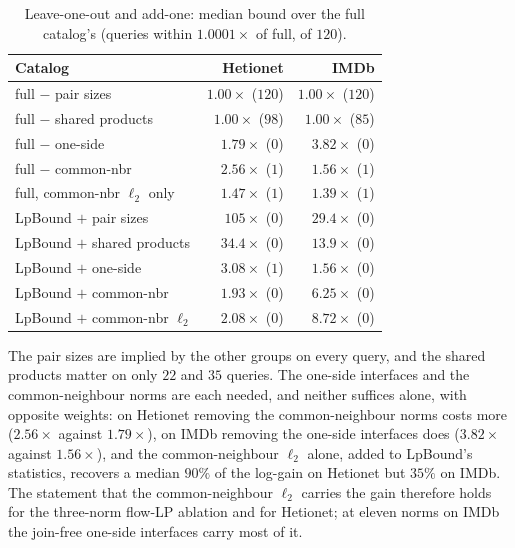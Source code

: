 \documentclass[11pt]{article}
\begin{document}
\begin{table}[h]
\centering
\caption{Leave-one-out and add-one: median bound over the full catalog's
(queries within $1.0001\times$ of full, of $120$).}
\label{tab:loo}
\small
\begin{tabular}{@{}lrr@{}}
\toprule
Catalog & Hetionet & IMDb \\
\midrule
full $-$ pair sizes & $1.00\times$ ($120$) & $1.00\times$ ($120$) \\
full $-$ shared products & $1.00\times$ ($98$) & $1.00\times$ ($85$) \\
full $-$ one-side & $1.79\times$ ($0$) & $3.82\times$ ($0$) \\
full $-$ common-nbr & $2.56\times$ ($1$) & $1.56\times$ ($1$) \\
full, common-nbr $\ell_2$ only & $1.47\times$ ($1$) & $1.39\times$ ($1$) \\
\midrule
LpBound $+$ pair sizes & $105\times$ ($0$) & $29.4\times$ ($0$) \\
LpBound $+$ shared products & $34.4\times$ ($0$) & $13.9\times$ ($0$) \\
LpBound $+$ one-side & $3.08\times$ ($1$) & $1.56\times$ ($0$) \\
LpBound $+$ common-nbr & $1.93\times$ ($0$) & $6.25\times$ ($0$) \\
LpBound $+$ common-nbr $\ell_2$ & $2.08\times$ ($0$) & $8.72\times$ ($0$) \\
\bottomrule
\end{tabular}
\end{table}

The pair sizes are implied by the other groups on every query, and the
shared products matter on only $22$ and $35$ queries. The one-side interfaces and the common-neighbour norms are each
needed, and neither suffices alone, with opposite weights: on Hetionet
removing the common-neighbour norms costs more ($2.56\times$ against
$1.79\times$), on IMDb removing the one-side interfaces does ($3.82\times$
against $1.56\times$), and the common-neighbour $\ell_2$ alone, added to
LpBound's statistics, recovers a median $90\%$ of the log-gain on Hetionet but
$35\%$ on IMDb. The statement that the common-neighbour $\ell_2$ carries the
gain therefore holds for the three-norm flow-LP ablation and for Hetionet; at
eleven norms on IMDb the join-free one-side interfaces carry most of it.
\end{document}
